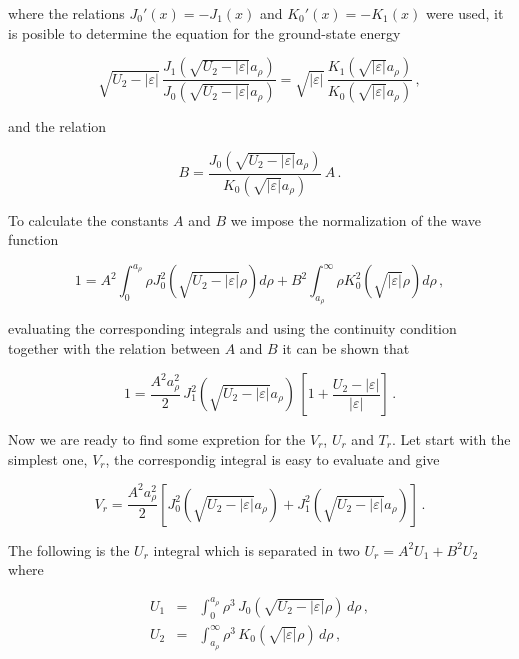 \documentclass[a4paper,10pt]{article}
\begin{document}
\noindent where the relations $J_0'(x) = -J_1(x)$ and $K_0'(x) = -K_1(x)$ were used, it is
posible to determine the equation for the ground-state energy

\begin{equation}
\sqrt{U_2 - |\varepsilon|}\,\frac{J_1(\sqrt{U_2-|\varepsilon|}a_{\rho})}{J_0(\sqrt{U_2-|\varepsilon|}a_{\rho})} =
\sqrt{|\varepsilon|}\, \frac{K_1(\sqrt{|\varepsilon|} a_{\rho})}{K_0(\sqrt{|\varepsilon|} a_{\rho})} \,,
\end{equation}

\noindent and the relation

\begin{equation}
B = \frac{J_0(\sqrt{U_2-|\varepsilon|}a_{\rho})}{K_0(\sqrt{|\varepsilon|} a_{\rho})}\, A \,.
\end{equation}

To calculate the constants $A$ and $B$ we impose the normalization of the wave function

\begin{equation}
1 = A^2 \int_0^{a_{\rho}} \rho J_0^2(\sqrt{U_2-|\varepsilon|} \rho) d\rho +
B^2\int_{a_{\rho}}^{\infty} \rho K_0^2(\sqrt{|\varepsilon|} \rho) d\rho\,,
\end{equation}

\noindent evaluating the corresponding integrals and using the continuity condition together with
the relation between $A$ and $B$ it can be shown that

\begin{equation}
1 = \frac{A^2 a_{\rho}^2}{2}\,J_1^2(\sqrt{U_2-|\varepsilon|}a_{\rho})\,\left[ 1 +
\frac{U_2-|\varepsilon|}{|\varepsilon|} \right]\,.
\end{equation}

Now we are ready to find some expretion for the $V_r$, $U_r$ and $T_r$. Let start with the
simplest one, $V_r$, the correspondig integral is easy to evaluate and give

\begin{equation}
  V_r = \frac{A^2 a_{\rho}^2}{2}\left[J_0^2(\sqrt{U_2-|\varepsilon|}a_{\rho})
  + J_1^2(\sqrt{U_2-|\varepsilon|}a_{\rho}) \right]\,.
\end{equation}

\noindent The following is the $U_r$ integral which is separated in two $U_r = A^2 U_1 + B^2 U_2$
where

\begin{eqnarray}
  U_1 &=& \int_0^{a_{\rho}} \rho^3\, J_0(\sqrt{U_2-|\varepsilon|}\rho)\,d\rho\,, \\
  U_2 &=& \int_{a_{\rho}}^{\infty} \rho^3\, K_0(\sqrt{|\varepsilon|}\rho)\,d\rho\,,
\end{eqnarray}
\end{document}
